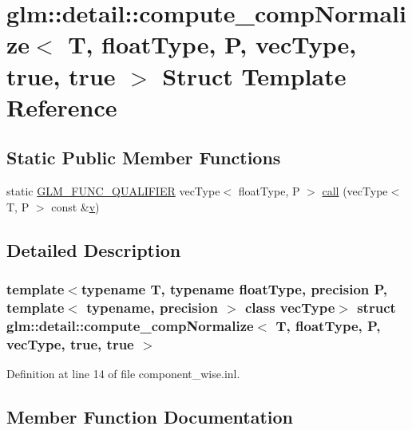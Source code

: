\hypertarget{structglm_1_1detail_1_1compute__comp_normalize_3_01_t_00_01float_type_00_01_p_00_01vec_type_00_01true_00_01true_01_4}{}\section{glm\+::detail\+::compute\+\_\+comp\+Normalize$<$ T, float\+Type, P, vec\+Type, true, true $>$ Struct Template Reference}
\label{structglm_1_1detail_1_1compute__comp_normalize_3_01_t_00_01float_type_00_01_p_00_01vec_type_00_01true_00_01true_01_4}
\subsection*{Static Public Member Functions}
\begin{DoxyCompactItemize}
\item 
static \mbox{\hyperlink{setup_8hpp_a33fdea6f91c5f834105f7415e2a64407}{G\+L\+M\+\_\+\+F\+U\+N\+C\+\_\+\+Q\+U\+A\+L\+I\+F\+I\+ER}} vec\+Type$<$ float\+Type, P $>$ \mbox{\hyperlink{structglm_1_1detail_1_1compute__comp_normalize_3_01_t_00_01float_type_00_01_p_00_01vec_type_00_01true_00_01true_01_4_ac66a98ef82bfc3fa7c62fb6d9eaf5f46}{call}} (vec\+Type$<$ T, P $>$ const \&\mbox{\hyperlink{glad_8h_a14cfbe2fc2234f5504618905b69d1e06}{v}})
\end{DoxyCompactItemize}


\subsection{Detailed Description}
\subsubsection*{template$<$typename T, typename float\+Type, precision P, template$<$ typename, precision $>$ class vec\+Type$>$\newline
struct glm\+::detail\+::compute\+\_\+comp\+Normalize$<$ T, float\+Type, P, vec\+Type, true, true $>$}



Definition at line 14 of file component\+\_\+wise.\+inl.



\subsection{Member Function Documentation}
\mbox{\label{structglm_1_1detail_1_1compute__comp_normalize_3_01_t_00_01float_type_00_01_p_00_01vec_type_00_01true_00_01true_01_4_ac66a98ef82bfc3fa7c62fb6d9eaf5f46}} 
